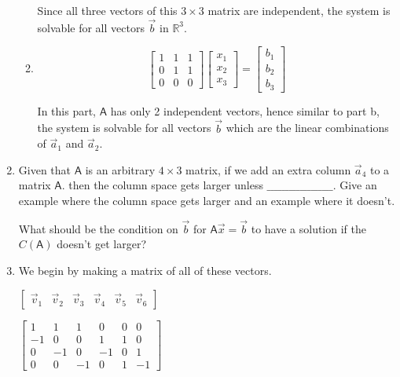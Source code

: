 \documentclass[a4paper, 11pt]{article}
\newcommand{\mat}[1]{\boldsymbol { \mathsf{#1}} }
\begin{document}
\begin{enumerate}
\begin{enumerate}
Since all three vectors of this $3\times3$ matrix are independent, the system is solvable for all vectors $\vec b$ in $\mathds{R}^3$.
\item
\[
 \left[ \begin{array}{ccc}
1  & 1 & 1\\
0  & 1 & 1\\
0 & 0 & 0
\end{array} \right]
%
\left[ \begin{array}{c}
 x_1\\
 x_2\\
x_3
\end{array} \right]
%
= \left[ \begin{array}{c}
 b_1\\
 b_2\\
 b_3 
\end{array} \right]
\]

In this part, $\mat A$ has only 2 independent vectors, hence similar to part b, the system is solvable for all vectors $\vec b$ which are the linear combinations of $\vec a_1$ and $\vec a_2$.

\end{enumerate}

\item Given that $\mat A$ is an arbitrary $4 \times 3$ matrix, if we add an extra column $\vec a_4$ to a matrix $\mat A$. then the column space gets larger unless $\_ \_ \_\_ \_ \_\_ \_ \_\_ \_ \_\_ \_ \_\_ \_ \_$. Give an example where the column space gets larger and an example where it doesn't. 

What should be the condition on $\vec b$ for $\mat A \vec x = \vec b$ to have a solution if the $C(\mat A)$ doesn't get larger?  

\item We begin by making a matrix of all of these vectors. 

\begin{center}

$
\begin{bmatrix}
\vec v_1 & \vec v_2 & \vec v_3 & \vec v_4 & \vec v_5 & \vec v_6  
\end{bmatrix}
$

$
\begin{bmatrix}
1 & 1 & 1 & 0 & 0 & 0 \\
-1 & 0 & 0 & 1 & 1 & 0\\
0 & -1 & 0 & -1 & 0 & 1\\ 
0 & 0 & -1 & 0 & 1 & -1 
\end{bmatrix}
$


\end{center}
\end{enumerate}
\end{document}
